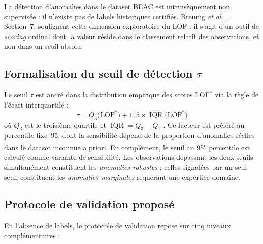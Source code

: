 \documentclass[12pt, a4paper]{article}
\begin{document}
La détection d'anomalies dans le dataset BEAC est intrinsèquement non
supervisée : il n'existe pas de labels historiques certifiés. Breunig
\textit{et al.}~\cite{breunig2000lof}, Section~7, soulignent cette dimension
exploratoire du LOF : il s'agit d'un outil de \textit{scoring} ordinal dont
la valeur réside dans le classement relatif des observations, et non dans un
seuil absolu.

\subsection{Formalisation du seuil de détection $\tau$}
\label{subsec:seuil}

Le seuil $\tau$ est ancré dans la distribution empirique des scores
LOF$^*$ \cite{kriegel2011outlier} via la règle de l'écart interquartile :
\[
    \tau = Q_3\!\bigl(\text{LOF}^*\bigr)
    + 1{,}5 \times \operatorname{IQR}\!\bigl(\text{LOF}^*\bigr)
\]
où $Q_3$ est le troisième quartile et
$\operatorname{IQR} = Q_3 - Q_1$ \cite{tukey1977eda}.
Ce facteur est préféré au percentile fixe~95, dont la sensibilité dépend de
la proportion d'anomalies réelles dans le dataset  inconnue a priori. En
complément, le seuil au 95\textsuperscript{e} percentile est calculé comme
variante de sensibilité. Les observations dépassant les deux seuils
simultanément constituent les \textit{anomalies robustes} ; celles signalées
par un seul seuil constituent les \textit{anomalies marginales} requérant
une expertise domaine.

\subsection{Protocole de validation proposé}
\label{subsec:protocole_val}

En l'absence de labels, le protocole de validation repose sur cinq niveaux
complémentaires :
\end{document}
